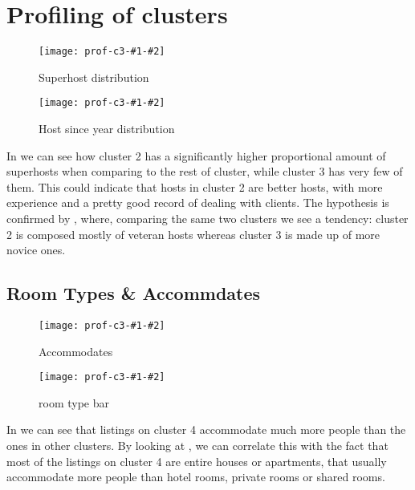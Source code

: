 
\section{Profiling of clusters}%
\label{sec:profiling_of_clusters}

\newcommand{\profiling}[3]{
\begin{figure}[H]
    \centering
    \texttt{[image: prof-c3-\#1-\#2]}
    \caption{#3}%
    \label{fig:prof-#1-#2}
\end{figure}
}


\profiling{host_is_superhost}{side}{Superhost distribution}
\profiling{host_since_year}{percent}{Host since year distribution}
In  we can see how cluster 2 has a significantly higher proportional amount of superhosts when comparing to the rest of cluster, while cluster 3 has very few of them. This could indicate that hosts in cluster 2 are better hosts, with more experience and a pretty good record of dealing with clients. The hypothesis is confirmed by , where, comparing the same two clusters we see a tendency: cluster 2 is composed mostly of veteran hosts whereas cluster 3 is made up of more novice ones.




\clearpage
\subsection{Room Types \& Accommdates}%





\profiling{accommodates}{meanp}{Accommodates}
\profiling{room_type}{side}{room type bar}
In  we can see that listings on cluster 4 accommodate
much more people than the ones in other clusters. By looking at , we can correlate this with the fact that most of the listings on cluster 4 are entire houses or apartments, that usually accommodate more people than hotel rooms, private rooms or shared rooms. 

